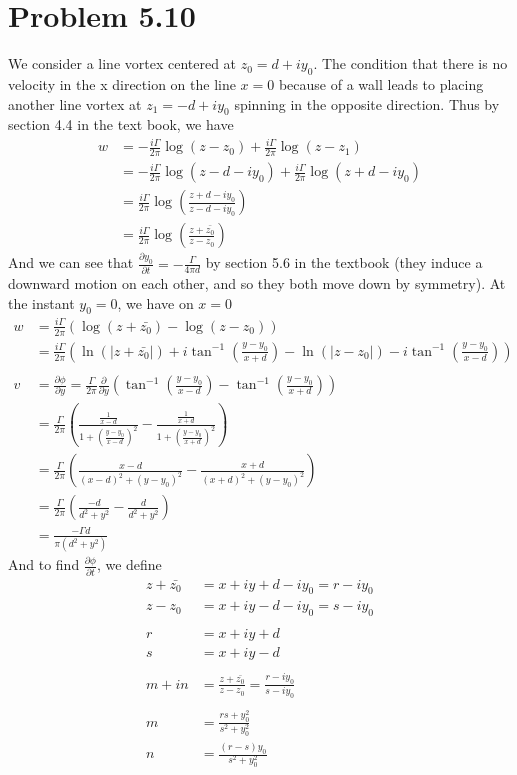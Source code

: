 \documentclass[12pt]{article}
\newcommand{\eq}[1]{\begin{align*}#1\end{align*}}
\newcommand{\p}[2]{\frac{\partial#1}{\partial#2}}
\begin{document}
\section*{Problem 5.10}
We consider a line vortex centered at $z_0 = d + iy_0$. The condition that there is no velocity in the x direction on the line $x = 0$ because of a wall leads to placing another line vortex at $z_1 = -d + iy_0$ spinning in the opposite direction. Thus by section 4.4 in the text book, we have
\eq{
	w &= -\frac{i\Gamma}{2\pi}\log(z - z_0) + \frac{i\Gamma}{2\pi}\log(z - z_1)\\
	&= -\frac{i\Gamma}{2\pi}\log(z - d - iy_0) + \frac{i\Gamma}{2\pi}\log(z + d - iy_0)\\
	&= \frac{i\Gamma}{2\pi}\log(\frac{z + d - iy_0}{z - d - iy_0})\\
	&= \frac{i\Gamma}{2\pi}\log(\frac{z + \bar{z_0}}{z - z_0})
}
And we can see that $\p{y_0}{t} = -\frac{\Gamma}{4\pi d}$ by section 5.6 in the textbook (they induce a downward motion on each other, and so they both move down by symmetry).
At the instant $y_0 = 0$, we have on $x = 0$
\eq{
	w &= \frac{i\Gamma}{2\pi}\left( \log(z + \bar{z_0}) - \log(z - z_0)\right)\\
	&= \frac{i\Gamma}{2\pi}\left( \ln(|z + \bar{z_0}|) + i\tan^{-1}\left(\frac{y - y_0}{x + d}\right) - \ln(|z - z_0|) - i\tan^{-1}\left(\frac{y - y_0}{x - d}\right) \right)\\
	\\
	v &= \p{\phi}{y} = \frac{\Gamma}{2\pi}\p{}{y}\left( \tan^{-1}\left(\frac{y - y_0}{x - d}\right) - \tan^{-1}\left(\frac{y - y_0}{x + d} \right) \right)\\
	&= \frac{\Gamma}{2\pi}\left( \frac{\frac{1}{x-d}}{1 + \left( \frac{y - y_0}{x -d}\right)^2} - \frac{\frac{1}{x+d}}{1 + \left( \frac{y - y_0}{x + d}\right)^2} \right)\\
	&= \frac{\Gamma}{2\pi}\left( \frac{x-d}{(x-d)^2 + (y-y_0)^2} - \frac{x+d}{(x+d)^2 + (y-y_0)^2} \right)\\
	&= \frac{\Gamma}{2\pi}\left( \frac{-d}{d^2 + y^2} - \frac{d}{d^2 + y^2}\right)\\
	&= \frac{-\Gamma d}{\pi(d^2 + y^2)}
}
And to find $\p{\phi}{t}$, we define
\eq{
	z + \bar{z_0} &= x + iy + d - iy_0 = r - iy_0\\
	z - z_0 &= x + iy - d - iy_0 = s - iy_0\\
	\\
	r &= x + iy + d\\
	s &= x + iy - d\\
	\\
	m + in &= \frac{z + \bar{z_0}}{z - z_0} = \frac{r - iy_0}{s - iy_0}\\
	\\
	m &= \frac{rs + y_0^2}{s^2 + y_0^2}\\
	n &= \frac{(r-s)y_0}{s^2 + y_0^2}\\
}
\end{document}
